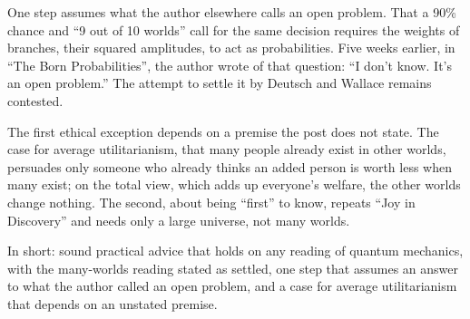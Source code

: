 \begin{afterword}
One step assumes what the author elsewhere calls an open problem. That a 90\% chance and ``9 out of 10 worlds'' call for the same decision requires the weights of branches, their squared amplitudes, to act as probabilities. Five weeks earlier, in ``The Born Probabilities'', the author wrote of that question: ``I don't know. It's an open problem.'' The attempt to settle it by Deutsch and Wallace remains contested.

The first ethical exception depends on a premise the post does not state. The case for average utilitarianism, that many people already exist in other worlds, persuades only someone who already thinks an added person is worth less when many exist; on the total view, which adds up everyone's welfare, the other worlds change nothing. The second, about being ``first'' to know, repeats ``Joy in Discovery'' and needs only a large universe, not many worlds.

In short: sound practical advice that holds on any reading of quantum mechanics, with the many-worlds reading stated as settled, one step that assumes an answer to what the author called an open problem, and a case for average utilitarianism that depends on an unstated premise.
\end{afterword}
